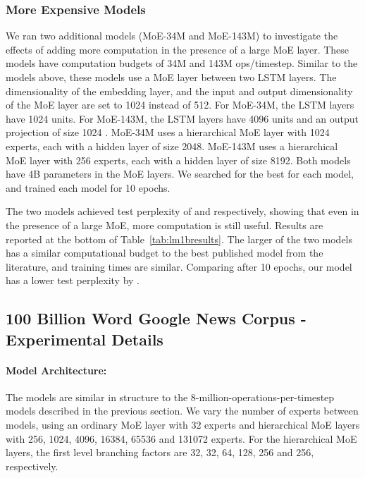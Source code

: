 \documentclass{article} \pdfoutput=1
\begin{document}
\subsubsection{More Expensive Models}\label{sec:expensive}

We ran two additional models (MoE-34M and MoE-143M) to investigate the effects of adding more computation in the presence of a large MoE layer.  These models have computation budgets of 34M and 143M ops/timestep.   Similar to the models above, these models use a MoE layer between two LSTM layers.  The dimensionality of the embedding layer, and the input and output dimensionality of the MoE layer are set to 1024 instead of 512.  For MoE-34M, the LSTM layers have 1024 units.  For MoE-143M, the LSTM layers have 4096 units and an output projection of size 1024  \citep{sak2014long}.  MoE-34M uses a hierarchical MoE layer with 1024 experts, each with a hidden layer of size 2048.   MoE-143M uses a hierarchical MoE layer with 256 experts, each with a hidden layer of size 8192.  Both models have 4B parameters in the MoE layers.  We searched for the best  for each model, and trained each model for 10 epochs.

The two models achieved test perplexity of  and  respectively, showing that even in the presence of a large MoE, more computation is still useful.  Results are reported at the bottom of Table~\ref{tab:lm1bresults}.   The larger of the two models has a similar computational budget to the best published model from the literature, and training times are similar.  Comparing after 10 epochs, our model has a lower test perplexity by . 


\subsection{100 Billion Word Google News Corpus - Experimental Details}\label{sec:appendixgn11}


\paragraph{Model Architecture:}  The models are similar in structure to the 8-million-operations-per-timestep models described in the previous section.   We vary the number of experts between models, using an ordinary MoE layer with 32 experts and hierarchical MoE layers with 256, 1024, 4096, 16384, 65536 and 131072 experts.   For the hierarchical MoE layers, the first level branching factors are 32, 32, 64, 128, 256 and 256, respectively.
\end{document}
